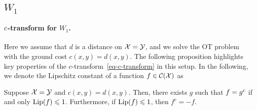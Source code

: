 
\subsection{$W_1$}

\paragraph{$c$-transform for $W_1$.}

Here we assume that $d$ is a distance on $\mathcal{X}=\mathcal{Y}$, and we solve the OT problem with the ground cost $c(x,y)=d(x,y)$. The following proposition highlights key properties of the $c$-transform~\eqref{eq-c-transform} in this setup. In the following, we denote the Lipschitz constant of a function $f \in \mathcal{C}(\mathcal{X})$ as

\begin{prop}Suppose $\mathcal{X}=\mathcal{Y}$ and $c(x,y)=d(x,y)$. 
Then, there exists $g$ such that $f = g^c$ if and only $\operatorname{Lip}(f) \leqslant 1$. 
Furthermore, if $\operatorname{Lip}(f)\leqslant1$, then $f^c=-f$.
\end{prop}


